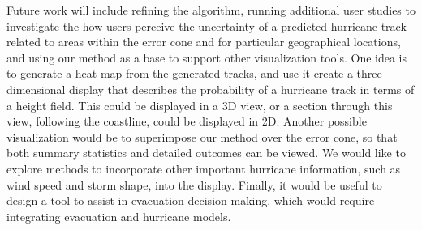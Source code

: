 \documentclass[journal]{vgtc}                %
\begin{document}
Future work will include refining the algorithm, running additional user studies to investigate the how users perceive the uncertainty of a predicted hurricane track related to areas within the error cone and for particular geographical locations, and using our method as a base to support other visualization tools.  One idea is to generate a heat map from the generated tracks, and use it create a three dimensional display that describes the probability of a hurricane track in terms of a height field. This could be displayed in a 3D view, or a section through this view, following the coastline, could be displayed in 2D. Another possible visualization would be to superimpose our method over the error cone, so that both summary statistics and detailed outcomes can be viewed. We would like to explore methods to incorporate other important hurricane information, such as wind speed and storm shape, into the display. Finally, it would be useful to design a tool to assist in evacuation decision making, which would require integrating evacuation and hurricane models.

















\end{document}
